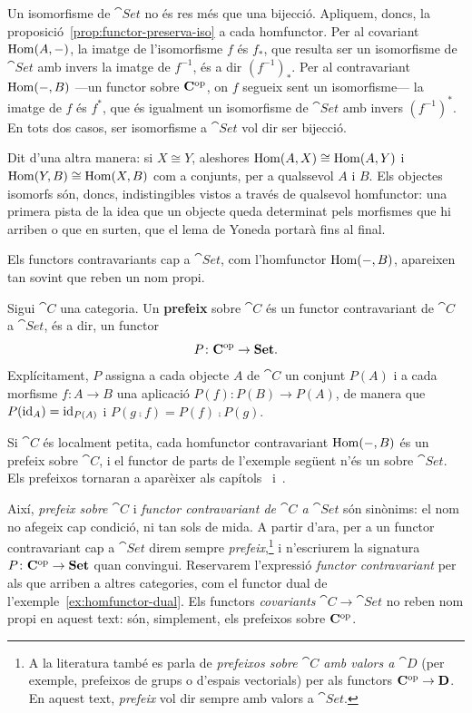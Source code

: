 \begin{prova}
Un isomorfisme de $\cat{Set}$ no és res més que una bijecció. Apliquem, doncs, la proposició~\ref{prop:functor-preserva-iso} a cada homfunctor. Per al covariant $\operatorname{Hom}(A,-)$, la imatge de l'isomorfisme $f$ és $f_*$, que resulta ser un isomorfisme de $\cat{Set}$ amb invers la imatge de $f^{-1}$, és a dir $(f^{-1})_*$. Per al contravariant $\operatorname{Hom}(-,B)$ ---un functor sobre $\mathbf{C}^{\mathrm{op}}$, on $f$ segueix sent un isomorfisme--- la imatge de $f$ és $f^*$, que és igualment un isomorfisme de $\cat{Set}$ amb invers $(f^{-1})^*$. En tots dos casos, ser isomorfisme a $\cat{Set}$ vol dir ser bijecció.
\end{prova}

Dit d'una altra manera: si $X\cong Y$, aleshores $\operatorname{Hom}(A,X)\cong\operatorname{Hom}(A,Y)$ i $\operatorname{Hom}(Y,B)\cong\operatorname{Hom}(X,B)$ com a conjunts, per a qualssevol $A$ i $B$. Els objectes isomorfs són, doncs, indistingibles vistos a través de qualsevol homfunctor: una primera pista de la idea que un objecte queda determinat pels morfismes que hi arriben o que en surten, que el lema de Yoneda portarà fins al final.

Els functors contravariants cap a $\cat{Set}$, com l'homfunctor $\operatorname{Hom}(-,B)$, apareixen tan sovint que reben un nom propi.

\begin{definicio}[Prefeix]\label{def:prefeix}
Sigui $\cat{C}$ una categoria. Un \textbf{prefeix} sobre $\cat{C}$ és un functor contravariant de $\cat{C}$ a $\cat{Set}$, és a dir, un functor
\[
P\colon\mathbf{C}^{\mathrm{op}}\to\mathbf{Set}.
\]
Explícitament, $P$ assigna a cada objecte $A$ de $\cat{C}$ un conjunt $P(A)$ i a cada morfisme $f\colon A\to B$ una aplicació $P(f)\colon P(B)\to P(A)$, de manera que $P(\operatorname{id}_A)=\operatorname{id}_{P(A)}$ i $P(g\comp f)=P(f)\comp P(g)$.
\end{definicio}

Si $\cat{C}$ és localment petita, cada homfunctor contravariant $\operatorname{Hom}(-,B)$ és un prefeix sobre $\cat{C}$, i el functor de parts de l'exemple següent n'és un sobre $\cat{Set}$. Els prefeixos tornaran a aparèixer als capítols~ i~.

Així, \emph{prefeix sobre $\cat{C}$} i \emph{functor contravariant de $\cat{C}$ a $\cat{Set}$} són sinònims: el nom no afegeix cap condició, ni tan sols de mida. A partir d'ara, per a un functor contravariant cap a $\cat{Set}$ direm sempre \emph{prefeix},\footnote{A la literatura també es parla de \emph{prefeixos sobre $\cat{C}$ amb valors a $\cat{D}$} (per exemple, prefeixos de grups o d'espais vectorials) per als functors $\mathbf{C}^{\mathrm{op}}\to\mathbf{D}$. En aquest text, \emph{prefeix} vol dir sempre amb valors a $\cat{Set}$.} i n'escriurem la signatura $P\colon\mathbf{C}^{\mathrm{op}}\to\mathbf{Set}$ quan convingui. Reservarem l'expressió \emph{functor contravariant} per als que arriben a altres categories, com el functor dual de l'exemple~\ref{ex:homfunctor-dual}. Els functors \emph{covariants} $\cat{C}\to\cat{Set}$ no reben nom propi en aquest text: són, simplement, els prefeixos sobre $\mathbf{C}^{\mathrm{op}}$.

